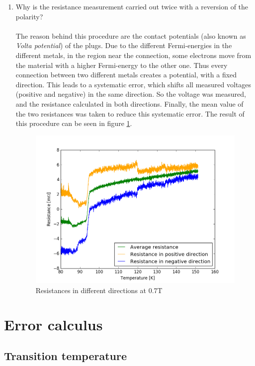 \documentclass[a4paper,parskip,11pt, DIV12]{scrreprt}
\begin{document}
\begin{enumerate}
\item Why is the resistance measurement carried out twice with a reversion of the polarity?\\
\\
The reason behind this procedure are the contact potentials (also known as \emph{Volta potential}) of the plugs. Due to the different Fermi-energies in the different metals, in the region near the connection, some electrons move from the material with a higher Fermi-energy to the other one. Thus every connection between two different metals creates a potential, with a fixed direction.  This leads to a systematic error, which shifts all measured voltages (positive and negative) in the same direction. So the voltage was measured, and the resistance calculated in both directions. Finally, the mean value of the two resistances was taken to reduce this systematic error. The result of this procedure can be seen in figure \ref{widerstand07T}.
\begin{figure}[H]
\centering
\includegraphics[scale=0.45]{widerstand07T}
\caption[]{Resistances in different directions at 0.7T}
\label{widerstand07T}
\end{figure}

\end{enumerate}

\chapter{Error calculus}

\section{Transition temperature}
\end{document}
